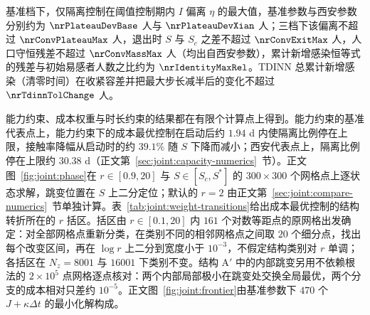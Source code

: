 基准档下，仅隔离控制在阈值控制期内 $I$ 偏离 $\eta$ 的最大值，基准参数与西安参数分别约为 $\nrPlateauDevBase$ 人与 $\nrPlateauDevXian$ 人；三档下该偏离不超过 $\nrConvPlateauMax$ 人，退出时 $S$ 与 $S_c$ 之差不超过 $\nrConvExitMax$ 人，人口守恒残差不超过 $\nrConvMassMax$ 人（均出自西安参数），累计新增感染恒等式的残差与初始易感者人数之比约为 $\nrIdentityMaxRel$。TDINN 总累计新增感染（清零时间）在收紧容差并把最大步长减半后的变化不超过 $\nrTdinnTolChange$ 人。

能力约束、成本权重与时长约束的结果都在有限个计算点上得到。能力约束的基准代表点上，能力约束下的成本最优控制在启动后约 $1.94$ d 内使隔离比例停在上限，接触率降幅从启动时的约 $39.1\%$ 随 $S$ 下降而减小；西安代表点上，隔离比例停在上限约 $30.38$ d（正文第~\ref{sec:joint:capacity-numerics}~节）。正文图~\ref{fig:joint:phase}在 $r\in[0.9,20]$ 与 $S\in[S_c,S^*]$ 的 $300\times300$ 个网格点上逐状态求解，跳变位置在 $S$ 上二分定位；默认的 $r=2$ 由正文第~\ref{sec:joint:compare-numerics}~节单独计算。表~\ref{tab:joint:weight-transitions}给出成本最优控制的结构转折所在的 $r$ 括区。括区由 $r\in[0.1,20]$ 内 $161$ 个对数等距点的原网格出发确定：对全部网格点重新分类，在类别不同的相邻网格点之间取 $20$ 个细分点，找出每个改变区间，再在 $\log r$ 上二分到宽度小于 $10^{-3}$，不假定结构类别对 $r$ 单调；各括区在 $N_z=8001$ 与 $16001$ 下类别不变。结构 A$'$ 中的内部跳变另用不依赖根法的 $2\times10^{5}$ 点网格逐点核对：两个内部局部极小在跳变处交换全局最优，两个分支的成本相对只差约 $10^{-5}$。正文图~\ref{fig:joint:frontier}由基准参数下 $470$ 个 $J+\kappa\Delta t$ 的最小化解构成。

